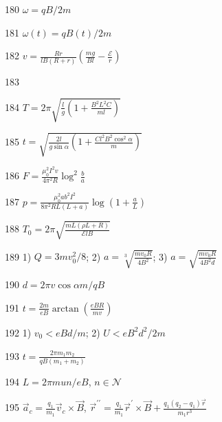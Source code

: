 \begin{Answer}{180}
$\omega = qB/2m$
\end{Answer}
\begin{Answer}{181}
$\omega(t) = qB(t)/2m$
\end{Answer}
\begin{Answer}{182}
$v = \frac{Rr}{lB(R+r)}\left( \frac{mg}{Bl} - \frac{\mathcal{E}}{r} \right)$
\end{Answer}
\begin{Answer}{183}

\end{Answer}
\begin{Answer}{184}
$T = 2\pi \sqrt{\frac{l}{g} \left( 1 + \frac{B^2L^2C}{ml} \right)}$
\end{Answer}
\begin{Answer}{185}
$t=\sqrt{\frac{2l}{g \sin \alpha} \left( 1 + \frac{C l^2B^2 \cos^2 \alpha}{m} \right)}$
\end{Answer}
\begin{Answer}{186}
$F=\frac{\mu_0^2 I^2 v}{4 \pi^2 R} \log^2 \frac{b}{a}$
\end{Answer}
\begin{Answer}{187}
$p=\frac{\mu_0^2ab^2I^2}{8\pi^2RL(L+a)}\log\left( 1+\frac{a}{L} \right)$
\end{Answer}
\begin{Answer}{188}
$T_0 = 2 \pi \sqrt{\frac{mL(\rho L + R)}{\mathcal{E}lB}}$
\end{Answer}
\begin{Answer}{189}
1) $Q = 3mv_0^2/8$; 2) $a=\sqrt[3]{\frac{mv_0R}{4B^2}}$; 3) $a=\sqrt{\frac{mv_0R}{4B^2d}}$
\end{Answer}
\begin{Answer}{190}
$d = 2 \pi v \cos \alpha m / qB$
\end{Answer}
\begin{Answer}{191}
$t=\frac{2m}{eB}\arctan \left( \frac{eBR}{mv}\right)$
\end{Answer}
\begin{Answer}{192}
1) $v_0 < eBd/m$; 2) $U < eB^2d^2/2m$
\end{Answer}
\begin{Answer}{193}
$t = \frac{2\pi m_1 m_2}{qB(m_1+m_2)}$
\end{Answer}
\begin{Answer}{194}
$L=2\pi m u n/ eB$, $n \in \mathcal{N}$
\end{Answer}
\begin{Answer}{195}
$\vec{a}_c = \frac{q_1}{m_1}\vec{v}_c \times \vec B$,
${\vec{r}}^{\prime \prime} = \frac{q_1}{m_1}\vec{r}^{\prime} \times \vec B + \frac{q_1(q_2-q_1)\vec r}{m_1 r^3}$
\end{Answer}
